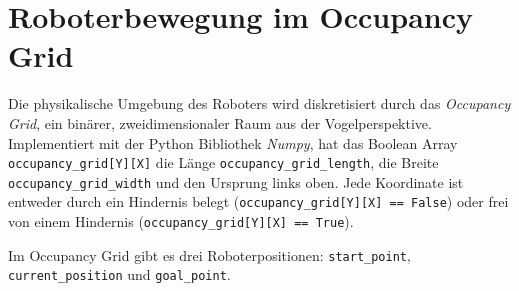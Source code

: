 \chapter{Roboterbewegung im Occupancy Grid} \label{ch:roboterbewegung}
Die physikalische Umgebung des Roboters wird diskretisiert durch das \textit{Occupancy Grid}, ein binärer, zweidimensionaler Raum aus der Vogelperspektive. Implementiert mit der Python Bibliothek \textit{Numpy}, hat das Boolean Array \texttt{occupancy\_grid[Y][X]} die Länge \texttt{occupancy\_grid\_length}, die Breite \texttt{occupancy\_grid\_width} und den Ursprung links oben. Jede Koordinate ist entweder durch ein Hindernis belegt (\texttt{occupancy\_grid[Y][X] == False}) oder frei von einem Hindernis (\texttt{occupancy\_grid[Y][X] == True}).

Im Occupancy Grid gibt es drei Roboterpositionen: \texttt{start\_point}, \texttt{current\_position} und \texttt{goal\_point}.
